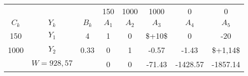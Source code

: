     \begin{tabular}{cccccccc}
    \hline
    \hline
            &         &         & 150     & 1000    & 1000    & 0       & 0 \bigstrut[t]\\
    $C_k$   & $Y_k$   & $B_k$   & $A_1$   & $A_2$   & $A_3$   & $A_4$   & $A_5$ \bigstrut[b]\\
    \hline
    150     & $Y_1$   & 4       & 1       & 0       & \$+10\$ & 0       & -20 \bigstrut[t]\\
    1000    & $Y_2$   & 0.33    & 0       & 1       & -0.57   & -1.43   & \$+1,14\$ \bigstrut[b]\\
    \hline
            & $W=928,57$ &         & 0       & 0       & -71.43  & -1428.57 & -1857.14 \bigstrut\\
    \hline
    \hline
    \end{tabular}%
